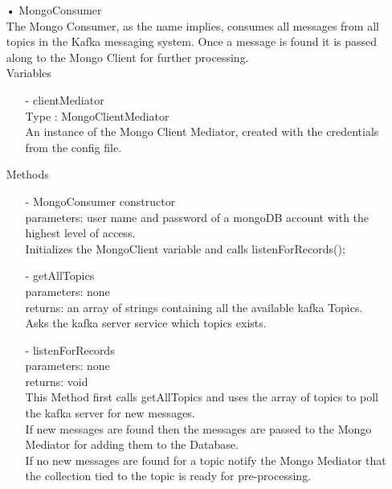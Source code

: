 \documentclass[oneside, english, final]{design}
\begin{document}
\begin{itemize}
	\item[•]MongoConsumer
	      \\The Mongo Consumer, as the name implies, consumes all messages from all topics in the Kafka messaging system. Once a message is found it is passed along to the Mongo Client for further processing.
	      \\Variables
	      \begin{itemize}
		      \item[-]clientMediator
		            \\Type : MongoClientMediator
		            \\ An instance of the Mongo Client Mediator, created with the credentials from the config file.
	      \end{itemize}
	      Methods
	      \begin{itemize}
		      \item[-]MongoConsumer constructor
		            \\parameters: user name and password of a mongoDB account with the highest level of access.
		            \\ Initializes the MongoClient variable and calls listenForRecords();
		      \item[-]getAllTopics
		            \\parameters: none
		            \\returns: an array of strings containing all the available kafka Topics.
		            \\Asks the kafka server service which topics exists.
		      \item[-]listenForRecords
		            \\parameters: none
		            \\returns: void
		            \\This Method first calls getAllTopics and uses the array of topics to poll the kafka server for new messages.
		            \\If new messages are found then the messages are passed to the Mongo Mediator for adding them to the Database.
		            \\If no new messages are found for a topic notify the Mongo Mediator that the collection tied to the topic is ready for pre-processing.
	      \end{itemize}



\end{itemize}
\end{document}
